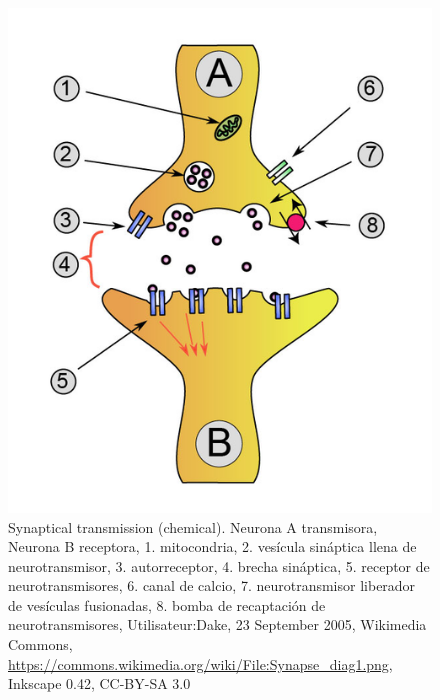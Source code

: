\begin{figure}[h]
 \centering
 \includegraphics[scale=0.4]{../Figuras/SinapsisQuimica1.png}
 \caption{Synaptical transmission (chemical). Neurona A transmisora, Neurona B receptora, 1. mitocondria, 2. vesícula sináptica llena de neurotransmisor, 3. autorreceptor, 4. brecha sináptica, 5. receptor de neurotransmisores, 6. canal de calcio, 7. neurotransmisor liberador de vesículas fusionadas, 8. bomba de recaptación de neurotransmisores, Utilisateur:Dake, 23 September 2005, Wikimedia Commons, \url{https://commons.wikimedia.org/wiki/File:Synapse_diag1.png}, Inkscape 0.42, CC-BY-SA 3.0}
 \label{fig:sinapsisQ}
\end{figure}


